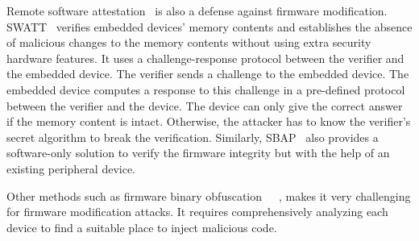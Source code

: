 Remote software attestation~\cite{li2011viper} is also a defense against firmware modification.  SWATT~\cite{seshadri2004swatt} verifies embedded devices' memory contents and establishes the absence of malicious changes to the memory contents without using extra security hardware features. It uses a challenge-response protocol between the
verifier and the embedded device. The verifier sends a challenge to the embedded device. The embedded device computes a response to this challenge in a pre-defined protocol between the verifier and the device. The device can only give the correct answer if the memory content is intact. Otherwise, the attacker has to know the verifier's secret algorithm to break the verification. Similarly, SBAP~\cite{li2010sbap} also provides a software-only solution to verify the firmware integrity but with the help of an existing peripheral device.

Other methods such as firmware binary obfuscation~\cite{cyr2019low}~\cite{schrittwieser2016protecting}~\cite{cheng2019dynopvm},  makes it very challenging for firmware modification attacks. It requires comprehensively analyzing each device to find a suitable place to inject malicious code.
